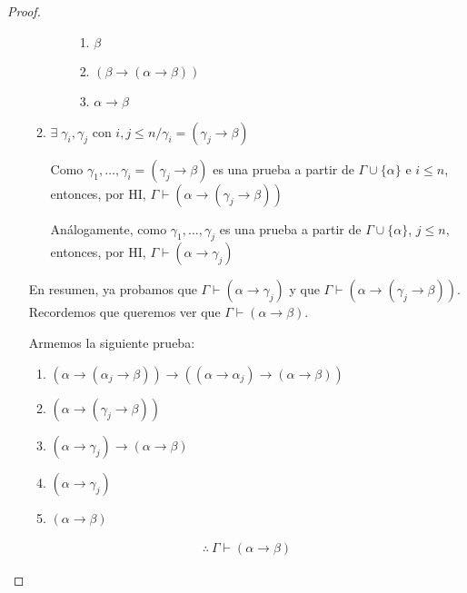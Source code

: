 \begin{proof}
\begin{itemize}
\begin{enumerate}
\begin{itemize}
                            \begin{enumerate}
                                \item $\beta$ %
                                \item $(\beta\to(\alpha\to\beta))$
                                \item $\alpha\to\beta$
                            \end{enumerate}
                    \end{itemize}

                \item $\exists \; \gamma_i, \gamma_j \text{ con } i,j\leq n /
                    \gamma_i = (\gamma_j \to \beta)$

                    Como $\gamma_1, \dotsc, \gamma_i = (\gamma_j\to\beta)$
                    es una prueba a partir de $\Gamma \cup \{ \alpha \}$
                    e $i \leq n$, entonces, por HI, 
                    $\Gamma\vdash(\alpha\to(\gamma_j\to\beta))$

                    Análogamente, como $\gamma_1, \dotsc, \gamma_j$ es una
                    prueba a partir de $\Gamma\cup \{ \alpha \}$, $j \leq n$,
                    entonces, por HI, $\Gamma \vdash(\alpha\to\gamma_j)$
            \end{enumerate}
            En resumen, ya probamos que $\Gamma \vdash (\alpha\to\gamma_j)$ y
            que $\Gamma\vdash(\alpha\to(\gamma_j\to\beta))$.
            Recordemos que queremos ver que $\Gamma\vdash(\alpha \to\beta)$.

            Armemos la siguiente prueba:
            \begin{enumerate}
                \item $(\alpha\to(\alpha_j\to\beta)) \to 
                    ((\alpha\to\alpha_j) \to (\alpha\to\beta))$
                \item $(\alpha \to (\gamma_j\to\beta))$
                \item $(\alpha \to \gamma_j)\to(\alpha\to\beta)$
                \item $(\alpha\to\gamma_j)$
                \item $(\alpha\to\beta)$ %
            \end{enumerate}
            \begin{gather*}
                \therefore ~ \Gamma \vdash (\alpha \to \beta)
            \end{gather*}
    \end{itemize}
\end{proof}

